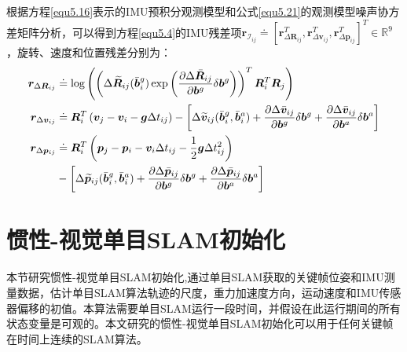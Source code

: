 根据方程\eqref{equ5.16}表示的IMU预积分观测模型和公式\eqref{equ5.21}的观测模型噪声协方差矩阵分析，可以得到方程\eqref{equ5.4}的IMU残差项$\boldsymbol{r}_{\mathcal{I}_{ij}} \doteq \left[ \boldsymbol{r}_{\Delta \boldsymbol{R}_{ij}}^T,\boldsymbol{r}_{\Delta \boldsymbol{v}_{ij}}^T, \boldsymbol{r}_{\Delta \boldsymbol{p}_{ij}}^T \right]^T \in \mathds{R}^9 $，旋转、速度和位置残差分别为：
\begin{equation}
\label{equ5.27}
\begin{aligned}
\boldsymbol{r}_{\Delta \boldsymbol{R}_{ij}} & \doteq \log \left( \left( \Delta \widetilde{\boldsymbol{R}}_{ij}(\bar{\boldsymbol{b}}_i^g) \exp \left( { \partial \Delta \bar{\boldsymbol{R}}_{ij} \over \partial \boldsymbol{b}^g } \delta \boldsymbol{b}^g \right) \right)^T \boldsymbol{R}_i^T \boldsymbol{R}_j  \right) 
\\
\boldsymbol{r}_{\Delta \boldsymbol{v}_{ij}} & \doteq \boldsymbol{R}_i^T \left(\boldsymbol{v}_j-\boldsymbol{v}_i-\boldsymbol{g}\Delta t_{ij} \right) - \left[ \Delta \widetilde{\boldsymbol{v}}_{ij}(\bar{\boldsymbol{b}}_i^g,\bar{\boldsymbol{b}}_i^a) + { \partial \Delta \bar{\boldsymbol{v}}_{ij} \over \partial \boldsymbol{b}^g } \delta \boldsymbol{b}^g + { \partial \Delta \bar{\boldsymbol{v}}_{ij} \over \partial \boldsymbol{b}^a } \delta \boldsymbol{b}^a  \right] 
\\
\boldsymbol{r}_{\Delta \boldsymbol{p}_{ij}} & \doteq \boldsymbol{R}_i^T \left( \boldsymbol{p}_j-\boldsymbol{p}_i-\boldsymbol{v}_i \Delta t_{ij} -{1 \over 2} \boldsymbol{g} \Delta t_{ij}^2 \right) \\
& - \left[ \Delta \widetilde{\boldsymbol{p}}_{ij}(\bar{\boldsymbol{b}}_i^g,\bar{\boldsymbol{b}}_i^a) + { \partial \Delta \bar{\boldsymbol{p}}_{ij} \over \partial \boldsymbol{b}^g } \delta \boldsymbol{b}^g + { \partial \Delta \bar{\boldsymbol{p}}_{ij} \over \partial \boldsymbol{b}^a } \delta \boldsymbol{b}^a  \right]
\end{aligned}
\end{equation}


\section{惯性-视觉单目SLAM初始化}
本节研究惯性-视觉单目SLAM初始化,通过单目SLAM获取的关键帧位姿和IMU测量数据\upcite{[5.3]}，估计单目SLAM算法轨迹的尺度，重力加速度方向，运动速度和IMU传感器偏移的初值。本算法需要单目SLAM运行一段时间，并假设在此运行期间的所有状态变量是可观的。本文研究的惯性-视觉单目SLAM初始化可以用于任何关键帧在时间上连续的SLAM算法。

